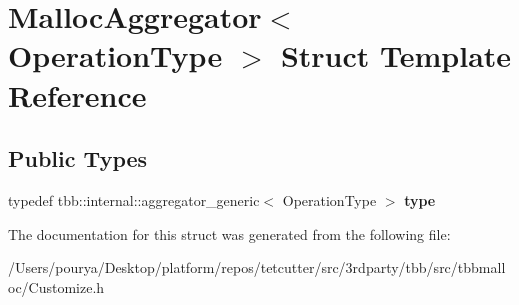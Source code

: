 \hypertarget{structMallocAggregator}{}\section{Malloc\+Aggregator$<$ Operation\+Type $>$ Struct Template Reference}
\label{structMallocAggregator}
\subsection*{Public Types}
\begin{DoxyCompactItemize}
\item 
\hypertarget{structMallocAggregator_ae29b685ca5645b8492981753373da31a}{}typedef tbb\+::internal\+::aggregator\+\_\+generic$<$ Operation\+Type $>$ {\bfseries type}\label{structMallocAggregator_ae29b685ca5645b8492981753373da31a}

\end{DoxyCompactItemize}


The documentation for this struct was generated from the following file\+:\begin{DoxyCompactItemize}
\item 
/\+Users/pourya/\+Desktop/platform/repos/tetcutter/src/3rdparty/tbb/src/tbbmalloc/Customize.\+h\end{DoxyCompactItemize}
